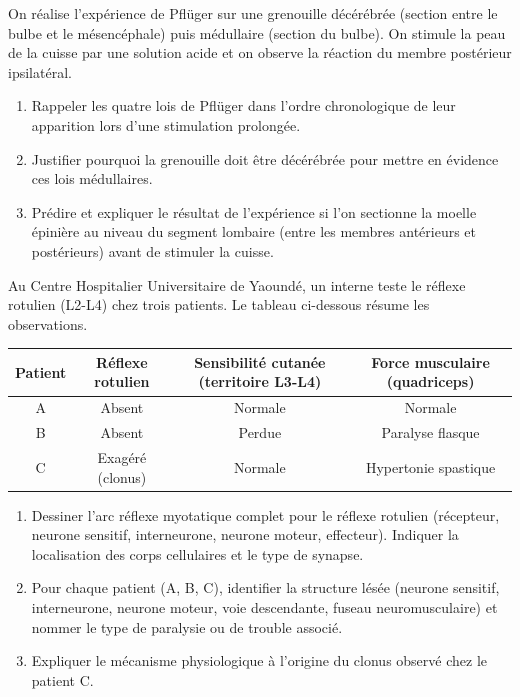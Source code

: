 \documentclass[11pt]{article}
\begin{document}
\begin{exercice}
On réalise l'expérience de Pflüger sur une grenouille décérébrée (section entre le bulbe et le mésencéphale) puis médullaire (section du bulbe). On stimule la peau de la cuisse par une solution acide et on observe la réaction du membre postérieur ipsilatéral.
\begin{enumerate}
    \item Rappeler les quatre lois de Pflüger dans l'ordre chronologique de leur apparition lors d'une stimulation prolongée.
    \item Justifier pourquoi la grenouille doit être décérébrée pour mettre en évidence ces lois médullaires.
    \item Prédire et expliquer le résultat de l'expérience si l'on sectionne la moelle épinière au niveau du segment lombaire (entre les membres antérieurs et postérieurs) avant de stimuler la cuisse.
\end{enumerate}
\end{exercice}

\begin{exercice}
Au Centre Hospitalier Universitaire de Yaoundé, un interne teste le réflexe rotulien (L2-L4) chez trois patients. Le tableau ci-dessous résume les observations.
\begin{center}
\begin{tabular}{|c|c|c|c|}
\hline
\textbf{Patient} & \textbf{Réflexe rotulien} & \textbf{Sensibilité cutanée (territoire L3-L4)} & \textbf{Force musculaire (quadriceps)} \\
\hline
A & Absent & Normale & Normale \\
\hline
B & Absent & Perdue & Paralyse flasque \\
\hline
C & Exagéré (clonus) & Normale & Hypertonie spastique \\
\hline
\end{tabular}
\end{center}
\begin{enumerate}
    \item Dessiner l'arc réflexe myotatique complet pour le réflexe rotulien (récepteur, neurone sensitif, interneurone, neurone moteur, effecteur). Indiquer la localisation des corps cellulaires et le type de synapse.
    \item Pour chaque patient (A, B, C), identifier la structure lésée (neurone sensitif, interneurone, neurone moteur, voie descendante, fuseau neuromusculaire) et nommer le type de paralysie ou de trouble associé.
    \item Expliquer le mécanisme physiologique à l'origine du clonus observé chez le patient C.
\end{enumerate}
\end{exercice}
\end{document}
